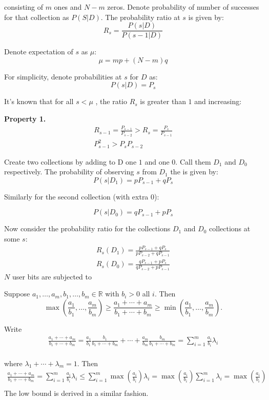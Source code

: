 \documentclass[11pt]{article}
\newcommand{\R}{\mathbb{R}}
\begin{document}
consisting of $m$ ones and $N-m$ zeros.  Denote probability of number of successes for that collection as $P(S|D)$.
The probability ratio at $s$  is given by:
\[ R_s = \frac{P(s|D)}{P(s-1|D)} \] 

Denote expectation of $s$ as $\mu$:
\[ \mu = mp + (N-m)q \]

For simplicity, denote probabilities at $s$ for $D$ as:
\[ P(s|D) = P_{s} \]

It's known that for all $s < \mu$ , the ratio $R_s$ is greater than $1$ and increasing:

\textbf{Property 1.}
\begin{align}
R_{s-1} = \frac{P_{s-1}}{P_{s-2}} > R_s  = \frac{P_{s}}{P_{s-1}} \\
P^2_{s-1} > P_sP_{s-2} 
\end{align}

Create two collections by adding to D one $1$ and one $0$.  Call them $D_1$ and $D_0$ respectively. The probability of observing $s$ from $D_1$ the is given by:
\[ P(s | D_1) = pP_{s-1} + qP_s \]

Similarly for the second collection (with extra 0):

\[ P(s | D_0) = qP_{s-1} + pP_s \]

Now consider the probability ratio for the collections $D_1$ and $D_0$ collections at some $s$:
\begin{align}
R_s(D_1) = \frac{ pP_{s-1} + qP_s }{pP_{s-2} + qP_{s-1}} \\
R_s(D_0) = \frac{ qP_{s-1} + pP_s }{qP_{s-2} + pP_{s-1}}
\end{align}
 $N$ user bits are subjected to  


\begin{lem} \label{lem:rsbound}
Suppose $a_1,\dots,a_m,b_1,\dots,b_m \in \R$ with $b_i > 0$ all $i$.
Then 
\[ \max\left(\frac{a_1}{b_1},\dots,\frac{a_m}{b_m}\right) \geq  \frac{a_1 + \cdots + a_m}{b_1 + \cdots + b_m} \geq \min \left(\frac{a_1}{b_1},\dots,\frac{a_m}{b_m}\right). \]
\end{lem}
\begin{pf}
Write
 \begin{align*}
  \frac{a_1 + \cdots + a_m}{b_1 + \cdots + b_m}
= \frac{a_1}{b_1}\frac{b_1}{b_1+\cdots+b_m} +
\cdots + \frac{a_m}{b_m}\frac{b_m}{b_1+\cdots+b_m} = \sum_{i=1}^m \frac{a_i}{b_i} \lambda_i  \\ 
\end{align*}

where $\lambda_1 + \cdots + \lambda_m = 1$.  Then
 \begin{align*}
  \frac{a_1 + \cdots + a_m}{b_1 + \cdots + b_m} = \sum_{i=1}^m \frac{a_i}{b_i} \lambda_i  \leq  \sum_{i=1}^m \max \left ( \frac{a_i}{b_i} \right ) \lambda_i  = \max \left ( \frac{a_i}{b_i} \right ) \sum_{i=1}^m \lambda_i = \max \left ( \frac{a_i}{b_i} \right ) \\ 
\end{align*}
The low bound is derived in a similar fashion. 
\end{pf}
\end{document}
